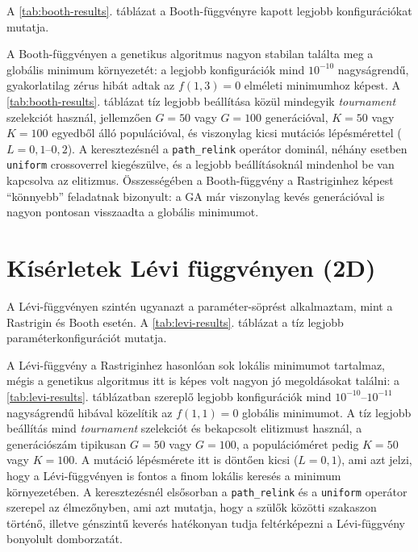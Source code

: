 \documentclass[a4paper,12pt]{article}
\begin{document}
A \ref{tab:booth-results}. táblázat a Booth-függvényre kapott
legjobb konfigurációkat mutatja.

\begin{table}[H]
  \centering
  \resizebox{\textwidth}{!}{%
  }
  \caption{A legjobb paraméterkonfigurációk a Booth függvényen (2D).}
  \label{tab:booth-results}
\end{table}

A Booth-függvényen a genetikus algoritmus nagyon stabilan találta meg a
globális minimum környezetét: a legjobb konfigurációk mind
$10^{-10}$ nagyságrendű, gyakorlatilag zérus hibát adtak az
$f(1,3)=0$ elméleti minimumhoz képest.
A \ref{tab:booth-results}. táblázat tíz legjobb beállítása közül
mindegyik \emph{tournament} szelekciót használ, jellemzően
$G=50$ vagy $G=100$ generációval, $K=50$ vagy $K=100$ egyedből álló
populációval, és viszonylag kicsi mutációs lépésmérettel ($L=0{,}1$–$0{,}2$).
A keresztezésnél a \texttt{path\_relink} operátor dominál, néhány
esetben \texttt{uniform} crossoverrel kiegészülve, és a legjobb
beállításoknál mindenhol be van kapcsolva az elitizmus.
Összességében a Booth-függvény a Rastriginhez képest ``könnyebb''
feladatnak bizonyult: a GA már viszonylag kevés generációval is
nagyon pontosan visszaadta a globális minimumot.

\section{Kísérletek Lévi függvényen (2D)}

A Lévi-függvényen szintén ugyanazt a paraméter-söprést alkalmaztam,
mint a Rastrigin és Booth esetén. A \ref{tab:levi-results}. táblázat
a tíz legjobb paraméterkonfigurációt mutatja.

\begin{table}[H]
  \centering
  \resizebox{\textwidth}{!}{%
  }
  \caption{A legjobb paraméterkonfigurációk a Lévi függvényen (2D).}
  \label{tab:levi-results}
\end{table}

A Lévi-függvény a Rastriginhez hasonlóan sok lokális minimumot tartalmaz,
mégis a genetikus algoritmus itt is képes volt nagyon jó megoldásokat
találni: a \ref{tab:levi-results}. táblázatban szereplő legjobb
konfigurációk mind $10^{-10}$–$10^{-11}$ nagyságrendű hibával
közelítik az $f(1,1)=0$ globális minimumot.
A tíz legjobb beállítás mind \emph{tournament} szelekciót és
bekapcsolt elitizmust használ, a generációszám tipikusan
$G=50$ vagy $G=100$, a populációméret pedig $K=50$ vagy $K=100$.
A mutáció lépésmérete itt is döntően kicsi ($L=0{,}1$),
ami azt jelzi, hogy a Lévi-függvényen is fontos a finom lokális
keresés a minimum környezetében.
A keresztezésnél elsősorban a \texttt{path\_relink} és a
\texttt{uniform} operátor szerepel az élmezőnyben, ami azt mutatja,
hogy a szülők közötti szakaszon történő, illetve génszintű keverés
hatékonyan tudja feltérképezni a Lévi-függvény bonyolult
domborzatát.
\end{document}
